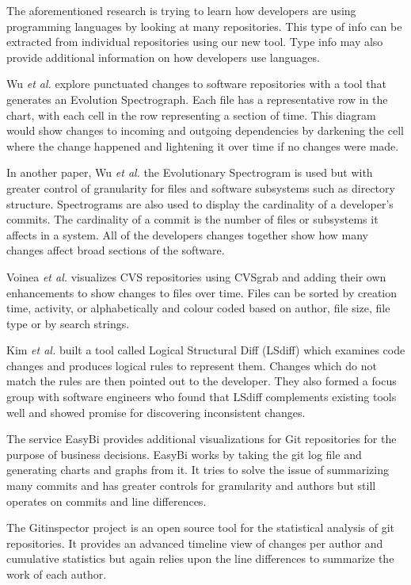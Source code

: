 \documentclass[conference]{IEEEtran}
\begin{document}
The aforementioned research is trying to learn how developers are using programming languages by looking at many repositories. This type of info can be extracted from individual repositories using our new tool. Type info may also provide additional information on how developers use languages.

Wu \textit{et al.} \cite{wu2004a} explore punctuated changes to software repositories with a tool that generates an Evolution Spectrograph. Each file has a representative row in the chart, with each cell in the row representing a section of time. This diagram would show changes to incoming and outgoing dependencies by darkening the cell where the change happened and lightening it over time if no changes were made.

In another paper, Wu \textit{et al.} \cite{wu2004} the Evolutionary Spectrogram is used but with greater control of granularity for files and software subsystems such as directory structure. Spectrograms are also used to display the cardinality of a developer’s commits. The cardinality of a commit is the number of files or subsystems it affects in a system. All of the developers changes together show how many changes affect broad sections of the software.

Voinea \textit{et al.} \cite{voinea2006} visualizes CVS repositories using CVSgrab and adding their own enhancements to show changes to files over time. Files can be sorted by creation time, activity, or alphabetically and colour coded based on author, file size, file type or by search strings.

Kim \textit{et al.} \cite{Kim:2009:DRS:1555001.1555046} built a tool called Logical Structural Diff (LSdiff) which examines code changes and produces logical rules to represent them. Changes which do not match the rules are then pointed out to the developer. They also formed a focus group with software engineers who found that LSdiff complements existing tools well and showed promise for discovering inconsistent changes.

The service EasyBi \cite{EasyBi} provides additional visualizations for Git repositories for the purpose of business decisions. EasyBi works by taking the git log file and generating charts and graphs from it. It tries to solve the issue of summarizing many commits and has greater controls for granularity and authors but still operates on commits and line differences.

The Gitinspector project \cite{Gitinspector} is an open source tool for the statistical analysis of git repositories. It provides an advanced timeline view of changes per author and cumulative statistics but again relies upon the line differences to summarize the work of each author.
\end{document}
